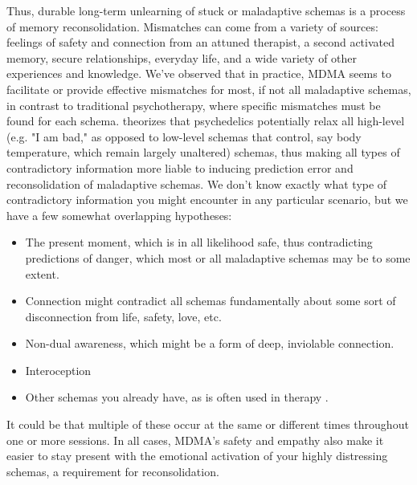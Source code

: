 \documentclass[12pt,letterpaper]{book}
\begin{document}
Thus, durable long-term unlearning of stuck or maladaptive schemas is a process of memory reconsolidation. Mismatches can come from a variety of sources: feelings of safety and connection from an attuned therapist, a second activated memory, secure relationships, everyday life, and a wide variety of other experiences and knowledge. We've observed that in practice, MDMA seems to facilitate or provide effective mismatches for most, if not all maladaptive schemas, in contrast to traditional psychotherapy, where specific mismatches must be found for each schema. \textcite{carhart2019rebus} theorizes that psychedelics potentially relax all high-level (e.g. "I am bad," as opposed to low-level schemas that control, say body temperature, which remain largely unaltered) schemas, thus making all types of contradictory information more liable to inducing prediction error and reconsolidation of maladaptive schemas. We don't know exactly what type of contradictory information you might encounter in any particular scenario, but we have a few somewhat overlapping hypotheses:
\begin{itemize}
	\item The present moment, which is in all likelihood safe, thus contradicting predictions of danger, which most or all maladaptive schemas may be to some extent.
	\item Connection might contradict all schemas fundamentally about some sort of disconnection from life, safety, love, etc.
	\item Non-dual awareness, which might be a form of deep, inviolable connection.
	\item Interoception \cite{carhart2019rebus}
	\item Other schemas you already have, as is often used in therapy \cite{eckerUnlocking}. 
\end{itemize}
It could be that multiple of these occur at the same or different times throughout one or more sessions. In all cases, MDMA's safety and empathy also make it easier to stay present with the emotional activation of your highly distressing schemas, a requirement for reconsolidation.
\end{document}
